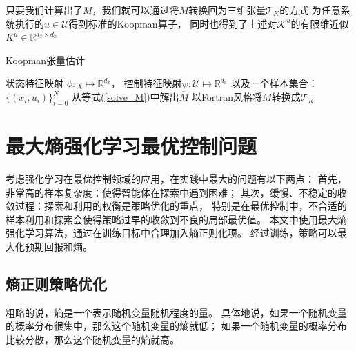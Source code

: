 \documentclass[AutoFakeBold]{LZUThesis}
\begin{document}
只要我们计算出了$M$，我们就可以通过将$M$转换回为三维张量$\mathcal{T}_K$的方式
为任意系统执行的$u \in \mathcal{U}$得到标准的Koopman算子，
同时也得到了上述对$\mathcal{K}^u$的有限维近似$K^u \in \mathbb{R}^{d_x \times d_x}$

\begin{algorithm}[htbp]
  \caption{Koopman张量估计}
  \label{KoopmanT}
  \begin{algorithmic}[1]
    \Require 状态特征映射 $\phi : \chi \mapsto \mathbb{R}^{d_x}$，
    控制特征映射$\psi : \mathcal{U} \mapsto \mathbb{R}^{d_u}$
    以及一个样本集合：$\{(x_i, u_i)\}_{i = 0}^{N}$
    \State 从等式(\ref{solve_M})中解出$\hat{M}$
    \State 以Fortran风格将$M$转换成$\mathcal{T}_K$
  \end{algorithmic}
\end{algorithm}


\section{最大熵强化学习最优控制问题}
考虑强化学习在最优控制领域的应用，在实践中最大的问题有以下两点：
首先，非常高的样本复杂度：使得智能体在探索中遇到困难；
其次，缓慢、不稳定的收敛过程：探索和利用的权衡是策略优化的重点，
特别是在最优控制中，不合适的样本利用和探索会使得策略过早的收敛到不良的局部最优值。
本文中使用最大熵强化学习算法，通过在训练目标中合理加入熵正则化项。
经过训练，策略可以最大化预期回报和熵。

\subsection{熵正则策略优化}
粗略的说，熵是一个表示随机变量随机程度的量。
具体地说，如果一个随机变量的概率分布很集中，那么这个随机变量的熵就低；
如果一个随机变量的概率分布比较分散，那么这个随机变量的熵就高。
\end{document}

